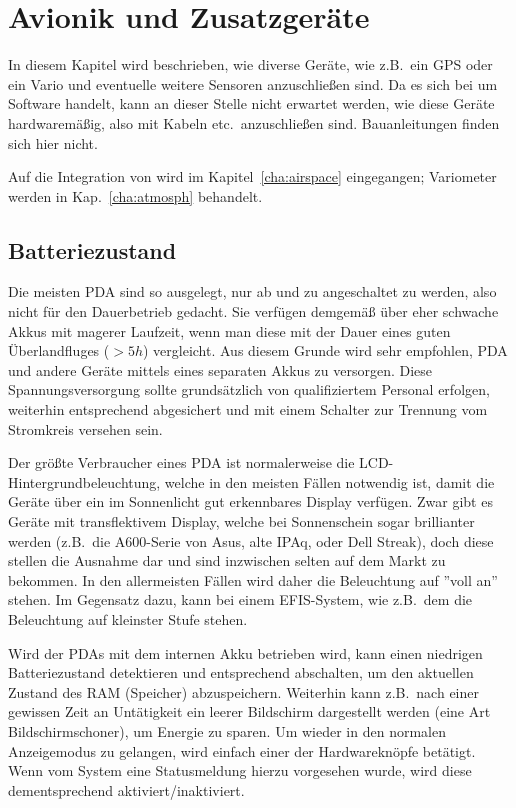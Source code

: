 \chapter{Avionik und Zusatzgeräte}\label{cha:avionics-airframe}

In diesem Kapitel wird beschrieben, wie diverse Geräte, wie z.B.\ ein GPS oder ein Vario und eventuelle weitere Sensoren anzuschließen sind. 
\warning  Da es sich bei \xc um Software handelt, kann an dieser Stelle nicht erwartet werden, wie diese Geräte hardwaremäßig, also mit Kabeln etc.\ anzuschließen sind. Bauanleitungen finden sich hier nicht.

Auf die Integration von \fl wird im Kapitel~\ref{cha:airspace}  eingegangen; Variometer werden in Kap.~\ref{cha:atmosph}  behandelt.
\section{Batteriezustand}

Die meisten \textsf{PDA} sind so ausgelegt, nur ab und zu angeschaltet zu werden, also nicht für den Dauerbetrieb gedacht. Sie verfügen demgemäß über eher schwache Akkus mit magerer Laufzeit, wenn man diese mit der Dauer eines guten Überlandfluges  ($>5h$) vergleicht. 
Aus diesem Grunde wird sehr empfohlen, \textsf{PDA} und andere Geräte mittels eines separaten Akkus zu versorgen. Diese Spannungsversorgung sollte grundsätzlich von qualifiziertem Personal erfolgen, weiterhin entsprechend abgesichert und mit einem Schalter zur Trennung vom Stromkreis versehen sein.

Der größte Verbraucher eines \textsf{PDA} ist normalerweise die LCD-Hintergrundbeleuchtung, welche in den meisten Fällen notwendig ist, damit die Geräte über ein im Sonnenlicht gut erkennbares Display verfügen. Zwar gibt es Geräte mit transflektivem Display, welche bei Sonnenschein sogar brillianter werden (z.B.\ die A600-Serie von Asus, alte IPAq, oder Dell Streak), doch diese stellen die Ausnahme dar und sind inzwischen selten auf dem Markt zu bekommen.  In den allermeisten Fällen wird daher die Beleuchtung auf ''voll an'' stehen. 
Im Gegensatz dazu, kann bei einem EFIS-System, wie z.B.\ dem \al die Beleuchtung auf kleinster Stufe stehen.


Wird der \textsf{PDA}s mit dem internen Akku betrieben wird, kann  \xc einen niedrigen Batteriezustand detektieren und entsprechend abschalten, um den aktuellen Zustand des RAM (Speicher) abzuspeichern. Weiterhin kann z.B.\ nach einer gewissen Zeit an Untätigkeit ein leerer Bildschirm  dargestellt werden (eine Art Bildschirmschoner), um Energie zu sparen.  
Um wieder in den normalen  Anzeigemodus zu gelangen, wird einfach einer der Hardwareknöpfe betätigt. Wenn vom System eine Statusmeldung hierzu vorgesehen wurde, wird diese dementsprechend aktiviert/inaktiviert.


